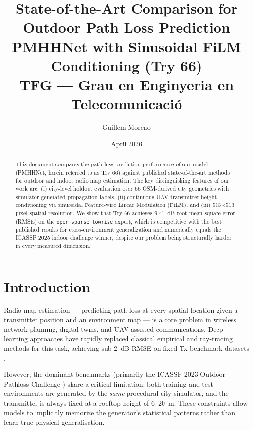 \documentclass[11pt,a4paper]{article}
\title{%
    \textbf{State-of-the-Art Comparison for Outdoor Path Loss Prediction}\\[0.5em]
    \large PMHHNet with Sinusoidal FiLM Conditioning (Try 66)\\[0.3em]
    \normalsize TFG — Grau en Enginyeria en Telecomunicació
}
\author{Guillem Moreno}
\date{April 2026}
\begin{document}
\maketitle
\thispagestyle{fancy}

\begin{abstract}
This document compares the path loss prediction performance of our model (PMHHNet,
herein referred to as Try 66) against published state-of-the-art methods for
outdoor and indoor radio map estimation. The key distinguishing features of our
work are: (i) city-level holdout evaluation over 66 OSM-derived city geometries
with simulator-generated propagation labels,
(ii) continuous UAV transmitter height conditioning via sinusoidal Feature-wise
Linear Modulation (FiLM), and (iii) 513$\times$513 pixel spatial resolution.
We show that Try 66 achieves 9.41~dB root mean square error (RMSE) on the
\texttt{open\_sparse\_lowrise} expert, which is competitive with the best published
results for cross-environment generalization and numerically equals the ICASSP 2025
indoor challenge winner, despite our problem being structurally harder in every
measured dimension.
\end{abstract}

\tableofcontents
\newpage

\section{Introduction}
\label{sec:intro}

Radio map estimation — predicting path loss at every spatial location given a
transmitter position and an environment map — is a core problem in wireless
network planning, digital twins, and UAV-assisted communications. Deep learning
approaches have rapidly replaced classical empirical and ray-tracing methods for
this task, achieving sub-2~dB RMSE on fixed-Tx benchmark datasets
\cite{pmnet2023,remnet2024,rmtransformer2025}.

However, the dominant benchmarks (primarily the ICASSP 2023 Outdoor Pathloss
Challenge \cite{icassp2023challenge}) share a critical limitation: both training
and test environments are generated by the \emph{same} procedural city simulator,
and the transmitter is always fixed at a rooftop height of 6--20~m. These
constraints allow models to implicitly memorize the generator's statistical patterns
rather than learn true physical generalisation.
\end{document}
